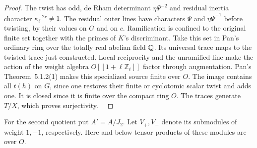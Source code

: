 \documentclass[a4paper,11pt]{article}
\theoremstyle{definition}
\theoremstyle{remark}
\newcommand{\ZZ}{\mathbb Z}\newcommand{\ord}{\operatorname{ord}}
\numberwithin{equation}{section}
\begin{document}
\begin{proof}
The twist has odd, de Rham determinant \(\eta\Psi^{-2}\)
and residual inertia character \(\bar\kappa_\ell^{-2r}\ne1\).
The residual outer lines have characters \(\bar\Psi\) and
\(\bar\eta\bar\Psi^{-1}\) before twisting, by their values on
\(G\) and on \(c\). Ramification is confined to the original
finite set together with the primes of \(K\)'s discriminant.
Take this set in Pan's ordinary ring over the totally real
abelian field \(\mathbb Q\). Its universal trace maps to the twisted
trace just constructed. Local reciprocity and the unramified
line make the action of the weight algebra
\(O[[1+\ell\ZZ_\ell]]\) factor through augmentation.
Pan's Theorem~5.1.2(1) makes this specialized source finite
over \(O\). The image contains all \(t(h)\) on \(G\), since
one restores their finite or cyclotomic scalar twist and adds
one. It is closed since it is finite over the compact ring
\(O\). The traces generate \(T/X\), which proves surjectivity.
~\cite{VIII-VI-VI-pan40}
\end{proof}

For the second quotient put \(A'=A/J_2\).
Let \(V_+,V_-\) denote its submodules of weight \(1,-1\),
respectively. Here and below tensor products of these modules
are over \(O\).
\end{document}
